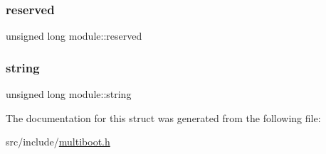 \subsubsection{\texorpdfstring{reserved}{reserved}}
{\footnotesize\ttfamily unsigned long module\+::reserved}

\mbox{\label{structmodule_a8a633c3be731cb6cdf8c5573bec1f0e8}} 
\subsubsection{\texorpdfstring{string}{string}}
{\footnotesize\ttfamily unsigned long module\+::string}



The documentation for this struct was generated from the following file\+:\begin{DoxyCompactItemize}
\item 
src/include/\hyperlink{multiboot_8h}{multiboot.\+h}\end{DoxyCompactItemize}
